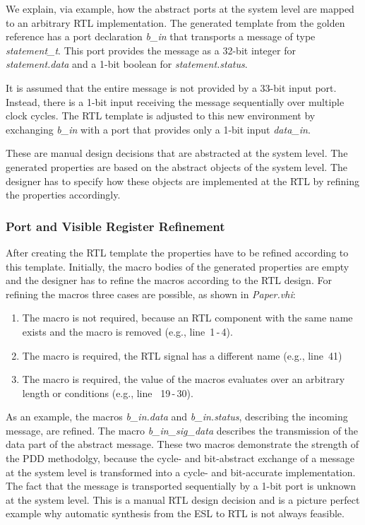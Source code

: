 We explain, via example, how the abstract ports at the system level are mapped to an arbitrary RTL implementation.
The generated template from the golden reference has a port declaration \textit{b\_in} that transports a message of type \textit{statement\_t}.
This port provides the message as a 32-bit integer for \textit{statement.data} and a 1-bit boolean for \textit{statement.status}.

It is assumed that the entire message is not provided by a 33-bit input port. 
Instead, there is a 1-bit input receiving the message sequentially over multiple clock cycles.
The RTL template is adjusted to this new environment by exchanging \textit{b\_in} with a port that provides only a 1-bit input \textit{data\_in}.

These are manual design decisions that are abstracted at the system level. 
The generated properties are based on the abstract objects of the system level. 
The designer has to specify how these objects are implemented at the RTL by refining the properties accordingly. 

\subsubsection{Port and Visible Register Refinement}

After creating the RTL template the properties have to be refined according to this template. 
Initially, the macro bodies of the generated properties are empty and the designer has to refine the macros according to the RTL design. 
For refining the macros three cases are possible, as shown in \textit{Paper.vhi}:
\newpage
\begin{enumerate}
\setlength\itemsep{0em}
\item The macro is not required, because an RTL component with the same name exists and the macro is removed (e.g., line~1\,-\,4). 
\item The macro is required, the RTL signal has a different name (e.g., line~41)
\item The macro is required, the value of the macros evaluates over an arbitrary length or conditions (e.g., line ~19\,-\,30). 
\end{enumerate}

As an example, the macros \textit{b\_in.data} and \textit{b\_in.status}, describing the incoming message, are refined. 
The macro \textit{b\_in\_sig\_data} describes the transmission of the data part of the abstract message. 
These two macros demonstrate the strength of the PDD methodolgy, because the cycle- and bit-abstract exchange of a message at the system level is transformed into a cycle- and bit-accurate implementation. 
The fact that the message is transported sequentially by a 1-bit port is unknown at the system level. 
This is a manual RTL design decision and is a picture perfect example why automatic synthesis from the ESL to RTL is not always feasible.
 
